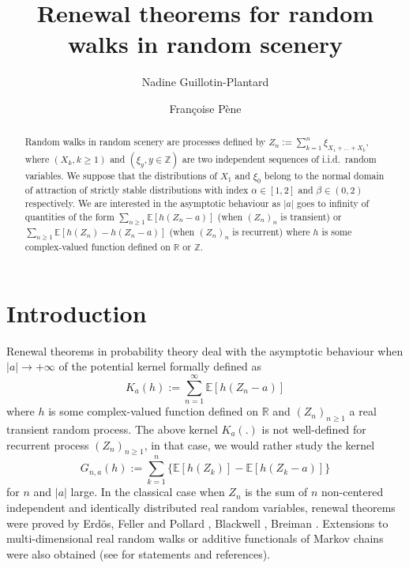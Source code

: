 \documentclass[oneside, a4paper,11pt,reqno]{amsart}
\title{Renewal theorems for random walks in random scenery}
\author{Nadine Guillotin-Plantard}
\author{Fran\c{c}oise P\`ene}
\begin{document}
\begin{abstract} 
Random walks in random scenery are processes defined by  
$Z_n:=\sum_{k=1}^n\xi_{X_1+...+X_k}$, where $(X_k,k\ge 1)$ and 
$(\xi_y,y\in\mathbb Z)$
are two independent sequences of i.i.d.~random variables. 
We suppose that the distributions of $X_1$ and $\xi_0$ belong
to the normal domain of attraction of strictly stable distributions
with index $\alpha\in[1,2]$ and $\beta\in(0,2)$ respectively. 
We are interested in the asymptotic behaviour as $|a|$ goes
to infinity of quantities of the form
$\sum_{n\ge 1}{\mathbb E}[h(Z_n-a)]$ (when $(Z_n)_n$ is transient) or 
$\sum_{n\ge 1}{\mathbb E}[h(Z_n)-h(Z_n-a)]$ (when $(Z_n)_n$ is recurrent) where $h$ is some complex-valued function defined on $\mathbb{R}$ or $\mathbb{Z}$.
\end{abstract}
\maketitle

\section{Introduction} 
Renewal theorems in probability theory deal with the asymptotic behaviour when $|a|\rightarrow +\infty$ of the potential kernel formally defined as
$$ K_a(h):= \sum_{n=1}^{\infty} \mathbb{E}[h(Z_n-a)]$$
where $h$ is some complex-valued function defined on $\mathbb{R}$ and $(Z_n)_{n\geq 1}$ a real
transient random process. 
The above kernel $K_a(.)$ 
is not well-defined for recurrent process $(Z_n)_{n\geq 1}$, in that case, we would rather 
study the kernel 
$$G_{n,a}(h) := \sum_{k=1}^n \Big\{\mathbb{E}[ h(Z_k)] - \mathbb{E}[ h(Z_k-a)] \Big\}$$ 
for $n$ and $|a|$ large.
In the classical case when $Z_n$ is the sum of $n$ non-centered  
independent and identically distributed real random variables, renewal theorems were proved 
by Erd\"{o}s, Feller and Pollard \cite{EFP}, Blackwell \cite{Bla1,Bla2}, Breiman \cite{Bre}. 
Extensions to multi-dimensional real random walks or additive functionals of Markov chains 
were also obtained (see \cite{Gui} for statements and references). 
\end{document}
